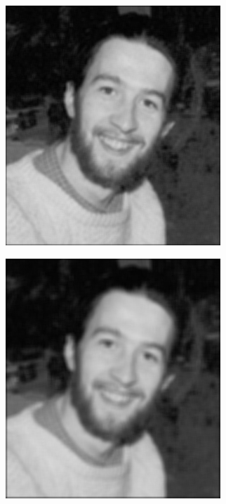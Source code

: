 \documentclass[12pt,a4paper]{report}
\begin{document}
\begin{figure}[!htb]
\begin{minipage}{\linewidth}
    \begin{subfigure}{0.49\textwidth}
      \includegraphics[width=\linewidth]{output/noise2_q1_K5P2.png}
    \end{subfigure}
    \begin{subfigure}{0.49\textwidth}
      \includegraphics[width=\linewidth]{output/noise2_q1_K7P3.png}
    \end{subfigure}


\end{minipage}
\end{figure}
\end{document}
